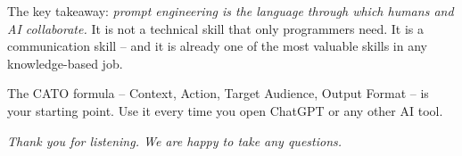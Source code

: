 \documentclass[12pt,a4paper]{article}
\begin{document}
The key takeaway: \emph{prompt engineering is the language through which humans and AI collaborate.} It is not a technical skill that only programmers need. It is a communication skill -- and it is already one of the most valuable skills in any knowledge-based job.

The CATO formula -- Context, Action, Target Audience, Output Format -- is your starting point. Use it every time you open ChatGPT or any other AI tool.

\vspace{1cm}
\begin{center}
\textit{Thank you for listening. We are happy to take any questions.}
\end{center}
\end{document}
